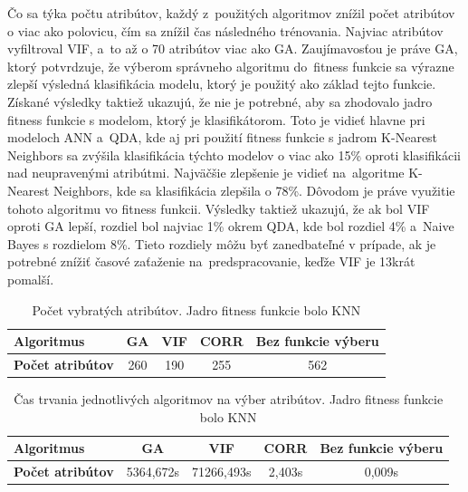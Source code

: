 \documentclass[runningheads]{llncs}
\begin{document}
Čo sa týka počtu atribútov, každý z~použitých algoritmov znížil počet atribútov o viac ako polovicu, čím sa znížil čas následného 
trénovania. Najviac atribútov vyfiltroval VIF, a~to až o 70 atribútov viac ako GA. 
Zaujímavosťou je práve GA, ktorý potvrdzuje, že výberom správneho algoritmu 
do~fitness funkcie sa výrazne zlepší výsledná klasifikácia modelu, ktorý je použitý
ako základ tejto funkcie. Získané výsledky taktiež ukazujú, že nie je potrebné, aby sa 
zhodovalo jadro fitness funkcie s modelom, ktorý je klasifikátorom. Toto je vidieť 
hlavne pri modeloch ANN a~QDA, kde aj pri použití fitness funkcie s jadrom 
K-Nearest Neighbors sa zvýšila klasifikácia týchto modelov o viac ako 15\% oproti 
klasifikácii nad neupravenými atribútmi. Najväčšie zlepšenie je vidieť na~algoritme 
K-Nearest Neighbors, kde sa klasifikácia zlepšila o 78\%. Dôvodom je práve využitie tohoto algoritmu vo fitness funkcii.
Výsledky taktiež ukazujú, že ak bol VIF oproti GA lepší, rozdiel bol najviac 1\% okrem QDA, 
kde bol rozdiel 4\% a~Naive Bayes s rozdielom 8\%. Tieto rozdiely môžu byť zanedbateľné v prípade, ak
je potrebné znížiť časové zaťaženie na~predspracovanie, keďže VIF je 13krát pomalší.

\begin{table}[]
    \centering
    \caption{Počet vybratých atribútov. Jadro fitness funkcie bolo KNN}\label{tab_pocet_vyber_atributov}
    \begin{tabular}{|l|c|c|c|c|}
    \hline
    \textbf{Algoritmus}                  & GA        & VIF         & CORR          & Bez funkcie výberu \\ \hline
    \textbf{Počet atribútov}            & 260        & 190         & 255          & 562 \\ \hline
    \end{tabular}
\end{table}

\begin{table}[]
    \centering
    \caption{Čas trvania jednotlivých algoritmov na výber atribútov. Jadro fitness funkcie bolo KNN}\label{tab_cas_vyber_atributov}
    \begin{tabular}{|l|c|c|c|c|}
    \hline
    \textbf{Algoritmus}                  & GA        & VIF         & CORR          & Bez funkcie výberu \\ \hline
    \textbf{Počet atribútov}            & 5364,672s        & 71266,493s         & 2,403s          & 0,009s \\ \hline
    \end{tabular}
\end{table}
\end{document}

